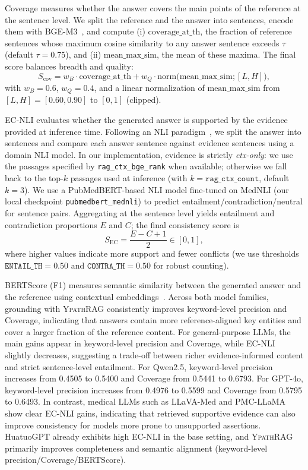 \documentclass[preprint,12pt,a4paper]{elsarticle}
\newcommand{\method}{\textsc{Ypath\-RAG}}
\begin{document}
Coverage measures whether the answer covers the main points of the reference at the sentence level.
We split the reference and the answer into sentences, encode them with BGE-M3~\cite{chen2024m3embedding}, and compute
(i) $\mathrm{coverage\_at\_th}$, the fraction of reference sentences whose maximum cosine similarity to any answer sentence exceeds $\tau$ (default $\tau=0.75$),
and (ii) $\mathrm{mean\_max\_sim}$, the mean of these maxima.
The final score balances breadth and quality:
\[
S_{\text{cov}}
= w_B\cdot \mathrm{coverage\_at\_th}
+ w_Q\cdot \mathrm{norm}\!\big(\mathrm{mean\_max\_sim};[L,H]\big),
\]
with $w_B=0.6$, $w_Q=0.4$, and a linear normalization of $\mathrm{mean\_max\_sim}$ from $[L,H]=[0.60,0.90]$ to $[0,1]$ (clipped).

EC-NLI evaluates whether the generated answer is supported by the evidence provided at inference time.
Following an NLI paradigm~\cite{bowman2015snli,williams2018mnli}, we split the answer into sentences and compare each answer sentence against evidence sentences using a domain NLI model.
In our implementation, evidence is strictly \emph{ctx-only}: we use the passages specified by \texttt{rag\_ctx\_bge\_rank} when available; otherwise we fall back to the top-$k$ passages used at inference (with $k=\texttt{rag\_ctx\_count}$, default $k=3$).
We use a PubMedBERT-based NLI model fine-tuned on MedNLI (our local checkpoint \texttt{pubmedbert\_mednli}) to predict entailment/contradiction/neutral for sentence pairs.
Aggregating at the sentence level yields entailment and contradiction proportions $E$ and $C$; the final consistency score is
\[
S_{\mathrm{EC}}=\frac{E-C+1}{2}\in[0,1],
\]
where higher values indicate more support and fewer conflicts (we use thresholds $\texttt{ENTAIL\_TH}=0.50$ and $\texttt{CONTRA\_TH}=0.50$ for robust counting).

BERTScore (F1) measures semantic similarity between the generated answer and the reference using contextual embeddings~\cite{zhang2020bertscore}.
Across both model families, grounding with \method{} consistently improves keyword-level precision and Coverage, indicating that answers contain more reference-aligned key entities and cover a larger fraction of the reference content.
For general-purpose LLMs, the main gains appear in keyword-level precision and Coverage, while EC-NLI slightly decreases, suggesting a trade-off between richer evidence-informed content and strict sentence-level entailment. For Qwen2.5, keyword-level precision increases from 0.4505 to 0.5400 and Coverage from 0.5441 to 0.6793. For GPT-4o, keyword-level precision increases from 0.4976 to 0.5599 and Coverage from 0.5795 to 0.6493.
In contrast, medical LLMs such as LLaVA-Med and PMC-LLaMA show clear EC-NLI gains, indicating that retrieved supportive evidence can also improve consistency for models more prone to unsupported assertions.
HuatuoGPT already exhibits high EC-NLI in the base setting, and \method{} primarily improves completeness and semantic alignment (keyword-level precision/Coverage/BERTScore).
\end{document}
